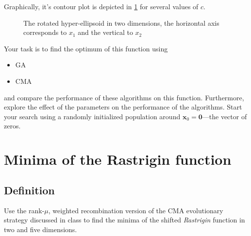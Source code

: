 \documentclass[11pt]{article}
\begin{document}
Graphically, it's contour plot is depicted in \cref{ellipsoid} for several
  values of \(c\).
\begin{figure}[h!]
\begin{center}
\end{center}
\caption{The rotated hyper-ellipsoid in two dimensions, the horizontal axis corresponds to \( x_1 \) and the vertical to \( x_2 \)}
\label{ellipsoid}
\end{figure}


Your task is to find the optimum of this function using
\begin{itemize}
\item GA
\item CMA
\end{itemize}
and compare the performance of these algorithms on this function. Furthermore,
explore the effect of the parameters on the performance of the algorithms.
Start your search using a randomly initialized population around \(\mathbf{x}_0 = \mathbf{0}\)---the vector of zeros.

\section{Minima of the Rastrigin function}
\label{sec:org54c362f}
\subsection{Definition}
\label{sec:orgd51ea11}
  Use the rank-\(\mu\), weighted recombination version of the CMA
evolutionary strategy discussed in class to find the minima of the shifted
\emph{Rastrigin} function in two and five dimensions.
\end{document}
